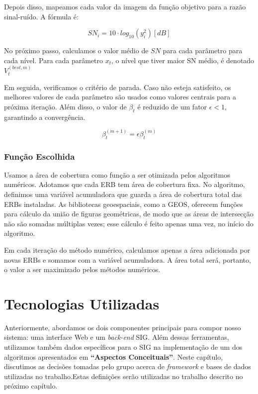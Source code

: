 \documentclass[]{politex}
\newcommand*\NewPage{\newpage\null\thispagestyle{empty}\newpage}
\begin{document}
Depois disso, mapeamos cada valor da imagem da função objetivo para a razão
sinal-ruído. A fórmula é:

\begin{equation}
    SN_i = 10\cdot log_{10}(y_i^2) [dB]
\end{equation}

No próximo passo, calculamos o valor médio de $SN$ para cada parâmetro para cada
nível. Para cada parâmetro $x_t$, o nível que tiver maior SN médio, é denotado
$V_t^{(best, m)}$

Em seguida, verificamos o critério de parada. Caso não esteja satisfeito, os
melhores valores de cada parâmetro são usados como valores centrais para a
próxima iteração. Além disso, o valor de $\beta_t$ é reduzido de um fator
$\epsilon < 1$, garantindo a convergência.

\begin{equation}
    \beta_t^{(m+1)} = \epsilon\beta_t^{(m)}
\end{equation}

\subsection{Função Escolhida}

Usamos a área de cobertura como função a ser otimizada pelos algoritmos
numéricos. Adotamos que cada ERB tem área de cobertura fixa. No algoritmo,
definimos uma variável acumuladora que guarda a área de cobertura total das ERBs
instaladas. As bibliotecas geoespaciais, como a GEOS, oferecem funções para
cálculo da união de figuras geométricas, de modo que as áreas de intersecção não
são somadas múltiplas vezes; esse cálculo é feito apenas uma vez, no início do
algoritmo.

Em cada iteração do método numérico, calculamos apenas a área adicionada por
novas ERBs e somamos com a variável acumuladora. A área total será, portanto, o
valor a ser maximizado pelos métodos numéricos.

\NewPage
\chapter{Tecnologias Utilizadas}

Anteriormente, abordamos os dois componentes principais para compor nosso
sistema: uma interface Web e um \textit{back-end} SIG. Além dessas ferramentas,
utilizamos também dados específicos para o SIG na implementação de um dos
algoritmos apresentados em \textbf{``Aspectos Conceituais''}. Neste capítulo,
discutimos as decisões tomadas pelo grupo acerca de \textit{framework} e bases de
dados utilizadas no trabalho.Estas definições serão utilizadas no trabalho
descrito no próximo capítulo.
\end{document}
